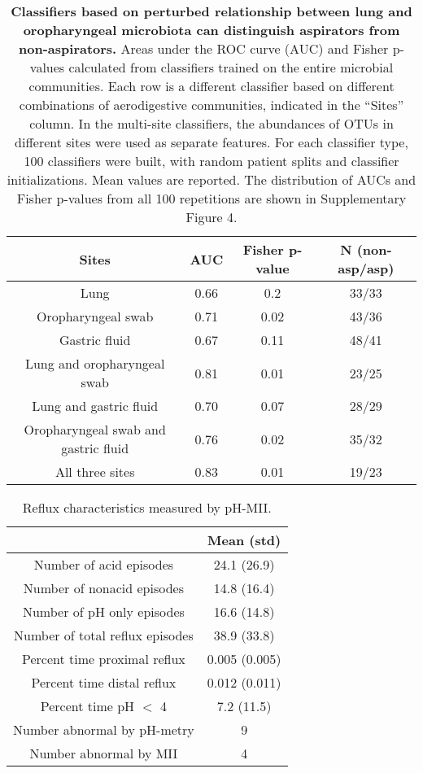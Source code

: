 \documentclass{article}
\begin{document}
\begin{table}
\begin{center}
\begin{tabular}{cccc}  
  Sites & AUC & Fisher p-value & N (non-asp/asp) \\
 \midrule
Lung & 0.66	& 0.2 & 33/33 \\
Oropharyngeal swab & 0.71 & 0.02 & 43/36 \\
Gastric fluid & 0.67 & 0.11 & 48/41 \\
Lung and oropharyngeal swab & 0.81 & 0.01 & 23/25 \\
Lung and gastric fluid & 0.70 & 0.07 & 28/29 \\
Oropharyngeal swab and gastric fluid & 0.76 & 0.02 & 35/32 \\
All three sites & 0.83 & 0.01 & 19/23 \\
\bottomrule
\end{tabular}
\caption{\textbf{Classifiers based on perturbed relationship between lung and oropharyngeal microbiota can distinguish aspirators from non-aspirators.} Areas under the ROC curve (AUC) and Fisher p-values calculated from classifiers trained on the entire microbial communities. Each row is a different classifier based on different combinations of aerodigestive communities, indicated in the ``Sites'' column. In the multi-site classifiers, the abundances of OTUs in different sites were used as separate features. For each classifier type, 100 classifiers were built, with random patient splits and classifier initializations. Mean values are reported. The distribution of AUCs and Fisher p-values from all 100 repetitions are shown in Supplementary Figure 4.}\label{tab:aspiration_aucs}
\end{center}
\end{table}

\begin{table}
\begin{center}
\begin{tabular}{cc}  
 & Mean (std) \\
 \midrule
Number of acid episodes & 24.1 (26.9) \\
Number of nonacid episodes & 14.8 (16.4) \\
Number of pH only episodes & 16.6 (14.8) \\
Number of total reflux episodes & 38.9 (33.8) \\
Percent time proximal reflux & 0.005 (0.005) \\
Percent time distal reflux & 0.012 (0.011) \\
Percent time pH $<$ 4 & 7.2 (11.5) \\
Number abnormal by pH-metry & 9 \\
Number abnormal by MII & 4 \\
\bottomrule
\end{tabular}
\caption{Reflux characteristics measured by pH-MII.}\label{tab:reflux}
\end{center}
\end{table}

\FloatBarrier
\newpage



\end{document}
